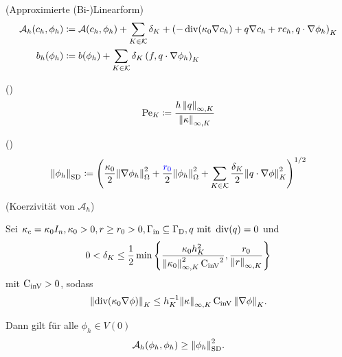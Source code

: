 \begin{define}(Approximierte (Bi-)Linearform)
	\begin{align*}
		\mathcal{A}_h(c_h, \phi_h) &\coloneqq \mathcal{A}(c_h, \phi_h) + \sum_{K \in \mathcal{K}} \delta_K + \left(-\operatorname{div}(\kappa_0 \nabla c_h) + q \nabla c_h + r c_h, q \cdot \nabla \phi_h\right)_K \\
		b_h(\phi_h) &\coloneqq b(\phi_h) + \sum_{K \in \mathcal{K}} \delta_K \left( f, q\cdot \nabla \phi_h \right)_K
	\end{align*}
\end{define}

\begin{define}()
	\[ \operatorname{Pe}_K \coloneqq \frac{h \, \norm{q}_{\infty, K}}{\norm{\kappa}_{\infty, K}} \]
\end{define}

\begin{define}()
	 \[ \norm{\phi_h}_{\operatorname{\text{SD}}} \coloneqq \left( \frac{\kappa_0}{2} \norm{\nabla \phi_h}_\Omega^2 + \frac{\textcolor{blue}{r_0}}{2} \norm{\phi_h}_\Omega^2+ \sum_{K \in \mathcal{K}} \frac{\delta_K}{2} \norm{q \cdot \nabla \phi}_K^2  \right)^{1/2}  \]
\end{define}

\begin{Lemma}(Koerzivität von $ \mathcal{A}_h $)
	
	Sei $ \kappa_c = \kappa_0 I_n, \kappa_0 > 0, r \geq r_0 > 0, \Gamma_{{\text{in}}} \subseteq \Gamma_{\text{D}}, q \text{ mit } \operatorname{div}(q) = 0 $ und \[ 0 < \delta_K \leq \frac{1}{2} \min\left\{ \frac{\kappa_0 h_K^2}{\norm{\kappa_0}_{\infty,K}^2 \operatorname{C_{\text{inV}}}^2} , \frac{r_0}{\norm{r}_{\infty, K}}   \right\}\] mit $ \operatorname{C_{\text{inV}}} > 0 $, sodass  \[ \norm{\operatorname{div}(\kappa_0 \nabla \phi)}_K \leq h_K^{-1} \norm{\kappa}_{\infty,K} \operatorname{C_{\text{inV}}} \norm{\nabla \phi}_K. \]
	
	Dann gilt für alle $ \phi_h \in V(0) $
	\[ \mathcal{A}_h(\phi_h, \phi_h) \geq \norm{\phi_h}_{\operatorname{\text{SD}}}^2. \]
\end{Lemma}

